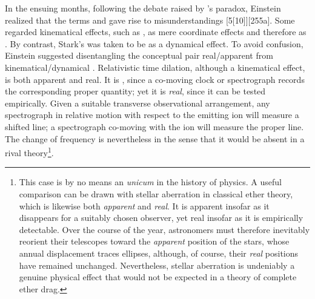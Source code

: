 \documentclass[submitted,12pt]{article}
\begin{document}
In the ensuing months, following the debate raised by \Ehr's paradox, Einstein realized that the terms  and  gave rise to misunderstandings [5{[}10{]}][255a]. Some regarded kinematical effects, such as , as mere coordinate effects and therefore as . By contrast, Stark's  was taken to be  as a dynamical effect. To avoid confusion, Einstein suggested disentangling the conceptual pair real/apparent from kinematical/dynamical \citep{Einstein1911d}. Relativistic time dilation, although a kinematical effect, is both apparent and real. It is , since a co-moving clock or spectrograph records the corresponding proper quantity; yet it is \emph{real}, since it can be tested empirically. Given a suitable transverse observational arrangement, any spectrograph in relative motion with respect to the emitting ion will measure a shifted line; a spectrograph co-moving with the ion will measure the proper line. The  change of frequency is nevertheless  in the sense that it would be absent in a rival theory\footnote{This case is by no means an \emph{unicum} in the history of physics. A useful comparison can be drawn with stellar aberration in classical ether theory, which is likewise both \emph{apparent} and \emph{real}. It is apparent insofar as it disappears for a suitably chosen observer, yet real insofar as it is empirically detectable. Over the course of the year, astronomers must therefore inevitably reorient their telescopes toward the \emph{apparent} position of the stars, whose annual displacement traces ellipses, although, of course, their \emph{real} positions have remained unchanged. Nevertheless, stellar aberration is undeniably a genuine physical effect that would not be expected in a theory of complete ether drag. }. %
\end{document}
